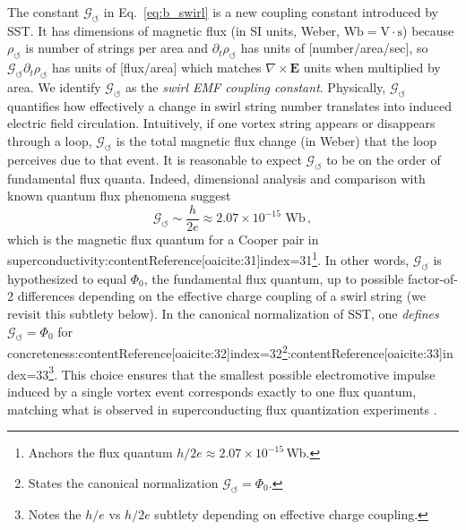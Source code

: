 \documentclass[12pt]{article}
\begin{document}
        The constant $\mathcal{G}_{\!\boldsymbol{\circlearrowleft}}$ in Eq.~\eqref{eq:b_swirl} is a new coupling constant introduced by SST. It has dimensions of magnetic flux (in SI units, Weber, $\text{Wb}=\text{V}\cdot\text{s}$) because $\rho_{\!\boldsymbol{\circlearrowleft}}$ is number of strings per area and $\partial_t \rho_{\!\boldsymbol{\circlearrowleft}}$ has units of [number/area/sec], so $\mathcal{G}_{\!\boldsymbol{\circlearrowleft}} \partial_t \rho_{\!\boldsymbol{\circlearrowleft}}$ has units of [flux/area] which matches $\nabla \times \mathbf{E}$ units when multiplied by area. We identify $\mathcal{G}_{\!\boldsymbol{\circlearrowleft}}$ as the \emph{swirl EMF coupling constant}. Physically, $\mathcal{G}_{\!\boldsymbol{\circlearrowleft}}$ quantifies how effectively a change in swirl string number translates into induced electric field circulation. Intuitively, if one vortex string appears or disappears through a loop, $\mathcal{G}_{\!\boldsymbol{\circlearrowleft}}$ is the total magnetic flux change (in Weber) that the loop perceives due to that event. It is reasonable to expect $\mathcal{G}_{\!\boldsymbol{\circlearrowleft}}$ to be on the order of fundamental flux quanta. Indeed, dimensional analysis and comparison with known quantum flux phenomena suggest
        \[
            \mathcal{G}_{\!\boldsymbol{\circlearrowleft}} \sim \frac{h}{2e} \approx 2.07\times 10^{-15}\text{ Wb}\,,
        \]
        which is the magnetic flux quantum for a Cooper pair in superconductivity:contentReference[oaicite:31]{index=31}\footnote{Anchors the flux quantum $h/2e\approx 2.07\times10^{-15}\,$Wb.}. In other words, $\mathcal{G}_{\!\boldsymbol{\circlearrowleft}}$ is hypothesized to equal $\Phi_{0}$, the fundamental flux quantum, up to possible factor-of-2 differences depending on the effective charge coupling of a swirl string (we revisit this subtlety below). In the canonical normalization of SST, one \emph{defines} $\mathcal{G}_{\!\boldsymbol{\circlearrowleft}} = \Phi_{0}$ for concreteness:contentReference[oaicite:32]{index=32}\footnote{States the canonical normalization $\mathcal G_{\!\circlearrowleft}=\Phi_0$.}:contentReference[oaicite:33]{index=33}\footnote{Notes the $h/e$ vs $h/2e$ subtlety depending on effective charge coupling.}. This choice ensures that the smallest possible electromotive impulse induced by a single vortex event corresponds exactly to one flux quantum, matching what is observed in superconducting flux quantization experiments \cite{Deaver1961,Doll1961}.
\end{document}
